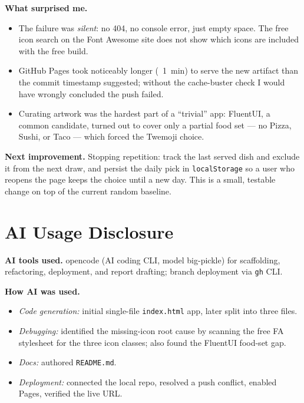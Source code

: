 \documentclass[11pt,a4paper]{article}
\begin{document}
\textbf{What surprised me.}
\begin{itemize}[leftmargin=2em,itemsep=1pt]
  \item The failure was \emph{silent}: no 404, no console error, just empty space. The free
        icon search on the Font Awesome site does not show which icons are included with the free build.
  \item GitHub Pages took noticeably longer (~1~min) to serve the new artifact than the
        commit timestamp suggested; without the cache-buster check I would have wrongly
        concluded the push failed.
  \item Curating artwork was the hardest part of a ``trivial'' app: FluentUI, a common
        candidate, turned out to cover only a partial food set --- no Pizza, Sushi, or Taco
        --- which forced the Twemoji choice.
\end{itemize}

\textbf{Next improvement.} Stopping repetition: track the last served dish and exclude it from the next draw, and persist the daily pick in \texttt{localStorage} so a user who reopens the page keeps the choice until a new day. This is a small, testable change on top of the current random baseline.

\section{AI Usage Disclosure}

\textbf{AI tools used.} opencode (AI coding CLI, model big-pickle) for scaffolding,
refactoring, deployment, and report drafting; branch deployment via \texttt{gh} CLI.

\textbf{How AI was used.}
\begin{itemize}[leftmargin=2em,itemsep=1pt]
  \item \emph{Code generation:} initial single-file \texttt{index.html} app, later split
        into three files.
  \item \emph{Debugging:} identified the missing-icon root cause by scanning the free FA
        stylesheet for the three icon classes; also found the FluentUI food-set gap.
  \item \emph{Docs:} authored \texttt{README.md}.
  \item \emph{Deployment:} connected the local repo, resolved a push conflict, enabled
        Pages, verified the live URL.
\end{itemize}
\end{document}
